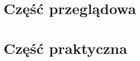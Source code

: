 \documentclass[12pt]{bsc}
\begin{document}
  
  \tableofcontents
  
  
  
  \part{Część przeglądowa}  
  

  \part{Część praktyczna}
  
  
  

  \pagestyle{plain}
  
  
  
   
  
  
  
\end{document}
